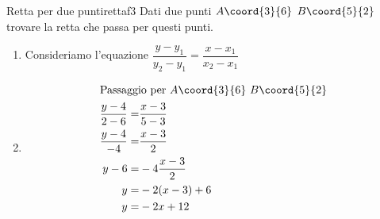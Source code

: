 \begin{esempiot}{Retta per due punti}{rettaf3}
	Dati due punti $A\coord{3}{6}$ $B\coord{5}{2}$ trovare la retta che passa per questi punti.
\end{esempiot}
\begin{enumerate}
	\item Consideriamo l'equazione  $\dfrac{y-y_1}{y_2-y_1}=\dfrac{x-x_1}{x_2-x_1}$
	\item \begin{align*}
		\intertext{Passaggio per $A\coord{3}{6}$ $B\coord{5}{2}$ }
	\dfrac{y-4}{2-6}=&\dfrac{x-3}{5-3}\\
	\dfrac{y-4}{-4}=&\dfrac{x-3}{2}\\
		y-6=&-4\dfrac{x-3}{2}\\
		y=&-2(x-3)+6\\
		y=&-2x+12
	\end{align*}
\end{enumerate}
